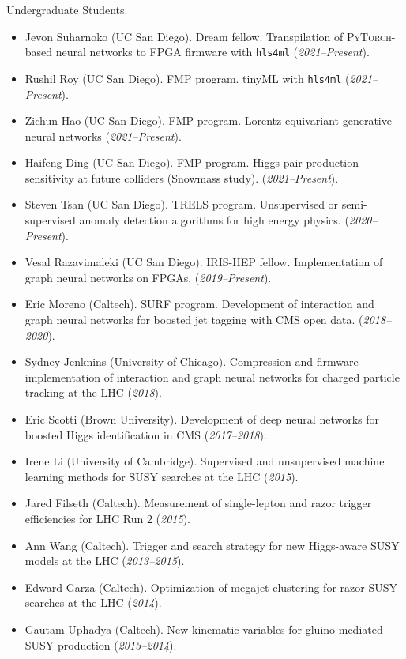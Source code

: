 \documentclass[11pt]{res}
\newif\ifext
\newenvironment{extended}{\ifext}{\fi}
\begin{document}
\begin{resume}
Undergraduate Students.
\begin{itemize}
\itemsep-0.3em
\item Jevon Suharnoko (UC San Diego). Dream fellow. Transpilation of \textsc{PyTorch}-based neural networks to FPGA firmware with \texttt{hls4ml} (\textit{2021--Present}).
\item Rushil Roy (UC San Diego). FMP program. tinyML with \texttt{hls4ml} (\textit{2021--Present}).
\item Zichun Hao (UC San Diego). FMP program. Lorentz-equivariant generative neural networks (\textit{2021--Present}).
\item Haifeng Ding (UC San Diego). FMP program. Higgs pair production sensitivity at future colliders (Snowmass study). (\textit{2021--Present}).
\item Steven Tsan (UC San Diego). TRELS program. Unsupervised or semi-supervised anomaly detection algorithms for high energy physics. (\textit{2020--Present}).
\item Vesal Razavimaleki (UC San Diego). IRIS-HEP fellow. Implementation of graph neural networks on FPGAs. (\textit{2019--Present}).
\item Eric Moreno (Caltech). SURF program. Development of interaction and graph neural networks for boosted jet tagging with CMS open data. (\textit{2018--2020}).
\item Sydney Jenknins (University of Chicago). Compression and firmware implementation of interaction and graph neural networks for charged particle tracking at the LHC (\textit{2018}).
\item Eric Scotti (Brown University). Development of deep neural networks for boosted Higgs identification in CMS (\textit{2017--2018}).
\begin{extended}
\item Irene Li (University of Cambridge). Supervised and unsupervised machine learning methods for SUSY searches at the LHC (\textit{2015}).
\item Jared Filseth (Caltech). Measurement of single-lepton and razor trigger efficiencies for LHC Run 2 (\textit{2015}).
\item Ann Wang (Caltech). Trigger and search strategy for new Higgs-aware SUSY models at the LHC (\textit{2013--2015}).
\item Edward Garza (Caltech). Optimization of megajet clustering for razor SUSY searches at the LHC (\textit{2014}).
\item Gautam Uphadya (Caltech). New kinematic variables for gluino-mediated SUSY production (\textit{2013--2014}).

\end{extended}
\end{itemize}
\end{resume}
\end{document}
